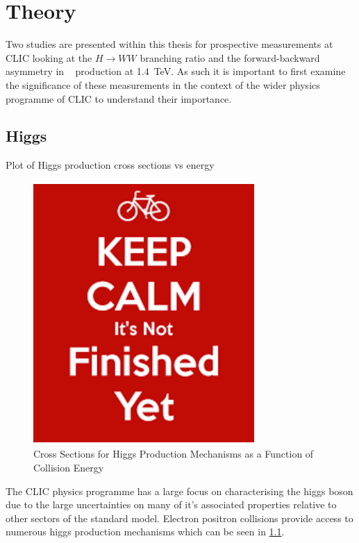 \chapter{Theory}

Two studies are presented within this thesis for prospective measurements at CLIC looking at the $H\rightarrow WW$ branching ratio and the forward-backward asymmetry in \ttbar~ production at 1.4~TeV. As such it is important to first examine the significance of these measurements in the context of the wider physics programme of CLIC to understand their importance.


\section{Higgs}

Plot of Higgs production cross sections vs energy

\begin{figure}
  \centering
  \includegraphics[width=0.75\textwidth,height=10cm,keepaspectratio]{Experiments/fig/dummy}
  \caption[Cross Sections for Higgs Production Mechanisms as a Function of Collision Energy]{Cross Sections for Higgs Production Mechanisms as a Function of Collision Energy}
  \label{fig:higgsXSecs}
\end{figure}

The CLIC physics programme has a large focus on characterising the higgs boson due to the large uncertainties on many of it's associated properties relative to other sectors of the standard model. Electron positron collisions provide access to numerous higgs production mechanisms which can be seen in \ref{fig:higgsXSecs}. 

